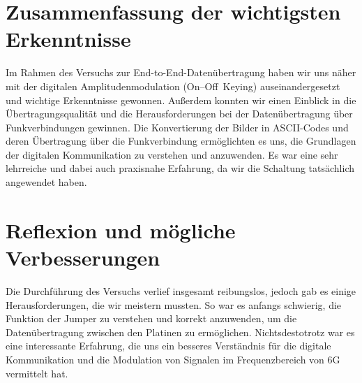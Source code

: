 \section{Zusammenfassung der wichtigsten Erkenntnisse}
Im Rahmen des Versuchs zur End-to-End-Datenübertragung haben wir uns näher mit der digitalen Amplitudenmodulation (On--Off~Keying) auseinandergesetzt und wichtige Erkenntnisse gewonnen.
Außerdem konnten wir einen Einblick in die Übertragungsqualität und die Herausforderungen bei der Datenübertragung über Funkverbindungen gewinnen. Die Konvertierung der Bilder in ASCII-Codes und deren Übertragung über die Funkverbindung ermöglichten es uns, die Grundlagen der digitalen Kommunikation zu verstehen und anzuwenden.
Es war eine sehr lehrreiche und dabei auch praxisnahe Erfahrung, da wir die Schaltung tatsächlich angewendet haben.
\section{Reflexion und mögliche Verbesserungen}
Die Durchführung des Versuchs verlief insgesamt reibungslos, jedoch gab es einige Herausforderungen, die wir meistern mussten. So war es anfangs schwierig, die Funktion der Jumper zu verstehen und korrekt anzuwenden, um die Datenübertragung zwischen den Platinen zu ermöglichen.
Nichtsdestotrotz war es eine interessante Erfahrung, die uns ein besseres Verständnis für die digitale Kommunikation und die Modulation von Signalen im Frequenzbereich von 6G vermittelt hat.
\clearpage
